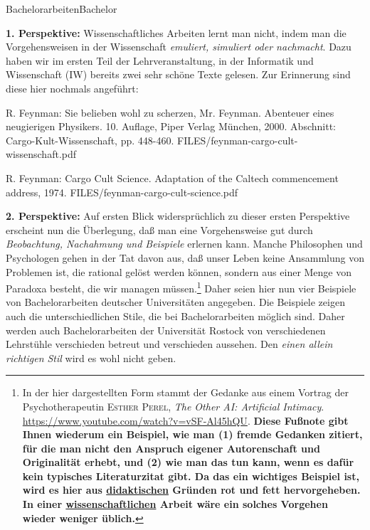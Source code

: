 



\unit{Bachelorarbeiten}{Bachelor}

\textbf{1. Perspektive:} Wissenschaftliches Arbeiten lernt man nicht, indem man die Vorgehensweisen
in der Wissenschaft \textit{emuliert, simuliert oder nachmacht}.
Dazu haben wir im ersten Teil der Lehrveranstaltung, in der Informatik und Wissenschaft (IW)
bereits zwei sehr schöne Texte gelesen. Zur Erinnerung
sind diese hier nochmals angeführt:

{R. Feynman: Sie belieben wohl zu scherzen, Mr. Feynman. Abenteuer eines neugierigen Physikers.
10. Auflage, Piper Verlag München, 2000.
Abschnitt: Cargo-Kult-Wissenschaft, pp. 448-460.}
{FILES/feynman-cargo-cult-wissenschaft.pdf}
{}

{R. Feynman: Cargo Cult Science. Adaptation of the Caltech commencement address, 1974.}
{FILES/feynman-cargo-cult-science.pdf}
{}

\bigskip

\textbf{2. Perspektive:} Auf ersten Blick widersprüchlich zu dieser
ersten Perspektive erscheint nun die Überlegung, daß man eine Vorgehensweise gut
durch \textit{Beobachtung,
Nachahmung und Beispiele} erlernen kann.
Manche Philosophen und Psychologen gehen in der Tat davon aus, daß unser Leben
keine Ansammlung von Problemen ist, die rational gelöst werden können,
sondern aus einer Menge von Paradoxa besteht, die wir managen müssen.\footnote{In der
hier dargestellten Form 
stammt der Gedanke aus 
einem Vortrag der Psychotherapeutin \textsc{Esther Perel},
\textit{The Other AI: Artificial Intimacy}.
\href{https://www.youtube.com/watch?v=vSF-Al45hQU}{https://www.youtube.com/watch?v=vSF-Al45hQU}.
\color{red}\bf Diese Fußnote gibt Ihnen wiederum ein Beispiel, wie man
(1) fremde Gedanken zitiert, für die man nicht den Anspruch eigener Autorenschaft
und Originalität erhebt, und (2) wie man das tun kann, wenn es dafür
kein typisches Literaturzitat gibt. Da das ein wichtiges Beispiel ist, wird es hier aus 
\underline{didaktischen}
Gründen rot und fett hervorgeheben. In einer \underline{wissenschaftlichen}
Arbeit wäre ein solches Vorgehen
wieder weniger üblich.
} Daher seien hier nun vier Beispiele von Bachelorarbeiten deutscher Universitäten
angegeben. Die Beispiele zeigen auch die unterschiedlichen Stile,
die bei Bachelorarbeiten möglich sind. Daher werden auch Bachelorarbeiten der Universität Rostock 
von verschiedenen Lehrstühle verschieden betreut und verschieden aussehen.
Den \textit{einen allein richtigen Stil} wird es wohl nicht geben.

